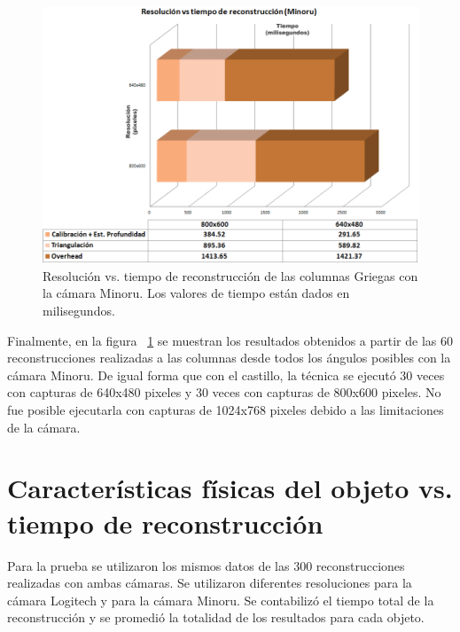 \begin{figure}[H]
\centering
\includegraphics[width=1.0\textwidth]{images/chart-gm1.png}
\caption[Resoluci\'{o}n vs. tiempo de reconstrucci\'{o}n de las columnas Griegas con la c\'{a}mara Minoru]%
{Resoluci\'{o}n vs. tiempo de reconstrucci\'{o}n de las columnas Griegas con la c\'{a}mara Minoru. Los valores de tiempo est\'{a}n dados en milisegundos.}
\label{fig:ChartGM1}
\end{figure}


Finalmente, en la figura ~\ref{fig:ChartGM1} se muestran los resultados obtenidos a partir de las 60 reconstrucciones realizadas a las columnas desde todos los \'{a}ngulos posibles con la c\'{a}mara Minoru. De igual forma que con el castillo, la t\'{e}cnica se ejecut\'{o} 30 veces con capturas de 640x480 pixeles y 30 veces con capturas de 800x600 pixeles. No fue posible ejecutarla con capturas de 1024x768 pixeles debido a las limitaciones de la c\'{a}mara.


\section{Caracter\'{i}sticas f\'{i}sicas del objeto vs. tiempo de reconstrucci\'{o}n}
Para la prueba se utilizaron los mismos datos de las 300 reconstrucciones realizadas con ambas c\'{a}maras. Se utilizaron diferentes resoluciones para la c\'{a}mara Logitech y para la c\'{a}mara Minoru. Se contabiliz\'{o} el tiempo total de la reconstrucci\'{o}n y se promedi\'{o} la totalidad de los resultados para cada objeto.

